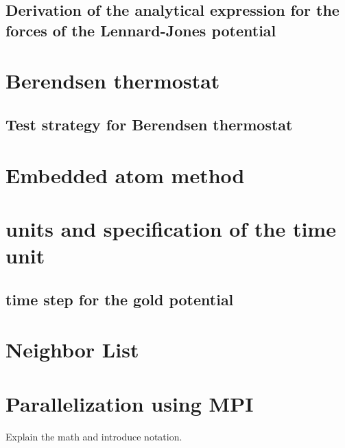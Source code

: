 \subsection{Derivation of the analytical expression for the forces of the Lennard-Jones potential}

\section{Berendsen thermostat}
\subsection{Test strategy for Berendsen thermostat}

\section{Embedded atom method}
\section{units and specification of the time unit}
\subsection{time step for the gold potential}


\section{Neighbor List}

\section{Parallelization using MPI}

Explain the math and introduce notation.

